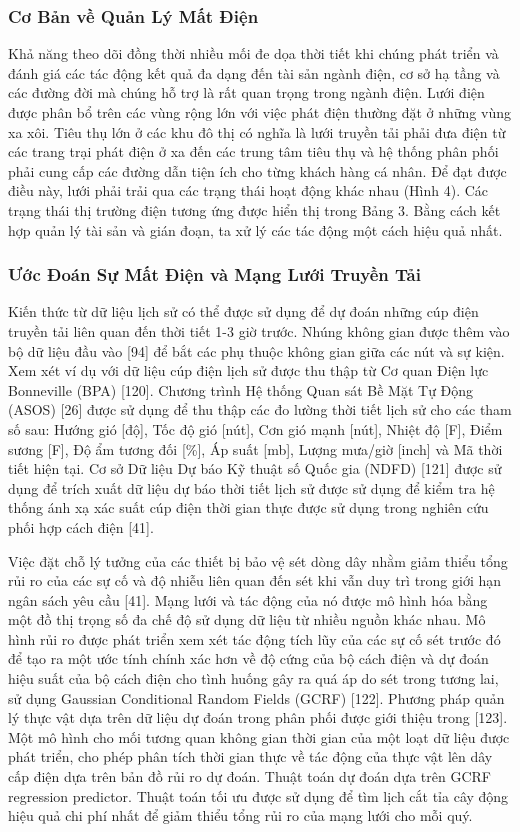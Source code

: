 \documentclass[utf8]{frontiersSCNS} %
\begin{document}
\subsubsection{Cơ Bản về Quản Lý Mất Điện}

Khả năng theo dõi đồng thời nhiều mối đe dọa thời tiết khi chúng phát triển và đánh giá các tác động kết quả đa dạng đến tài sản ngành điện, cơ sở hạ tầng và các đường đời mà chúng hỗ trợ là rất quan trọng trong ngành điện. Lưới điện được phân bổ trên các vùng rộng lớn với việc phát điện thường đặt ở những vùng xa xôi. Tiêu thụ lớn ở các khu đô thị có nghĩa là lưới truyền tải phải đưa điện từ các trang trại phát điện ở xa đến các trung tâm tiêu thụ và hệ thống phân phối phải cung cấp các đường dẫn tiện ích cho từng khách hàng cá nhân. Để đạt được điều này, lưới phải trải qua các trạng thái hoạt động khác nhau (Hình 4). Các trạng thái thị trường điện tương ứng được hiển thị trong Bảng 3. Bằng cách kết hợp quản lý tài sản và gián đoạn, ta xử lý các tác động một cách hiệu quả nhất.

\subsubsection{Ước Đoán Sự Mất Điện và Mạng Lưới Truyền Tải}
Kiến thức từ dữ liệu lịch sử có thể được sử dụng để dự đoán những cúp điện truyền tải liên quan đến thời tiết 1-3 giờ trước. Nhúng không gian được thêm vào bộ dữ liệu đầu vào [94] để bắt các phụ thuộc không gian giữa các nút và sự kiện. Xem xét ví dụ với dữ liệu cúp điện lịch sử được thu thập từ Cơ quan Điện lực Bonneville (BPA) [120]. Chương trình Hệ thống Quan sát Bề Mặt Tự Động (ASOS) [26] được sử dụng để thu thập các đo lường thời tiết lịch sử cho các tham số sau: Hướng gió [độ], Tốc độ gió [nút], Cơn gió mạnh [nút], Nhiệt độ [F], Điểm sương [F], Độ ẩm tương đối [\%], Áp suất [mb], Lượng mưa/giờ [inch] và Mã thời tiết hiện tại. Cơ sở Dữ liệu Dự báo Kỹ thuật số Quốc gia (NDFD) [121] được sử dụng để trích xuất dữ liệu dự báo thời tiết lịch sử được sử dụng để kiểm tra hệ thống ánh xạ xác suất cúp điện thời gian thực được sử dụng trong nghiên cứu phối hợp cách điện [41].

Việc đặt chỗ lý tưởng của các thiết bị bảo vệ sét dòng dây nhằm giảm thiểu tổng rủi ro của các sự cố và độ nhiễu liên quan đến sét khi vẫn duy trì trong giới hạn ngân sách yêu cầu [41]. Mạng lưới và tác động của nó được mô hình hóa bằng một đồ thị trọng số đa chế độ sử dụng dữ liệu từ nhiều nguồn khác nhau. Mô hình rủi ro được phát triển xem xét tác động tích lũy của các sự cố sét trước đó để tạo ra một ước tính chính xác hơn về độ cứng của bộ cách điện và dự đoán hiệu suất của bộ cách điện cho tình huống gây ra quá áp do sét trong tương lai, sử dụng Gaussian Conditional Random Fields (GCRF) [122]. Phương pháp quản lý thực vật dựa trên dữ liệu dự đoán trong phân phối được giới thiệu trong [123]. Một mô hình cho mối tương quan không gian thời gian của một loạt dữ liệu được phát triển, cho phép phân tích thời gian thực về tác động của thực vật lên dây cấp điện dựa trên bản đồ rủi ro dự đoán. Thuật toán dự đoán dựa trên GCRF regression predictor. Thuật toán tối ưu được sử dụng để tìm lịch cắt tỉa cây động hiệu quả chi phí nhất để giảm thiểu tổng rủi ro của mạng lưới cho mỗi quý.
\end{document}
